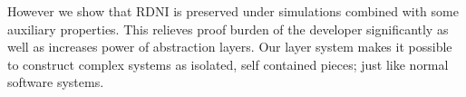 \documentclass[onecolumn]{paper}
\begin{document}
However we show that RDNI is preserved under simulations combined with some auxiliary properties. This relieves proof burden of the developer significantly as well as increases power of abstraction layers. Our layer system makes it possible to construct complex systems as isolated, self contained pieces; just like normal software systems.




\begin{comment}

\subsection*{System we consider}
We are consider a storage system with a course-grained ownership. smallest data unit will be referred as a data block, Data are accessed with "a handle", which represents a group of data blocks. Each handle has an owner that is allowed to read and write data to it as well as transfer its ownership to another user.

We are also assuming a crash-resistant transactional storage system where every API call is executed atomically. If a crash happens during an API call, then effects of the call either happens completely or doesn't happen at all.

We assume system is running on a disk with asynchronious buffered writes. Until an explicit sync operation is performeds, it is not guaranteed writes to be persisted on the disk. Ones that are persisted also could be out of order.

\subsection*{Running example}
Throughout the paper, we will follow the scenario where a user writes some data to a file and then transfers ownership of the file to another user.
\begin{lstlisting}
append_and_transfer(handle, data, new_owner)
  extend(handle, data)
  change_owner(handle, new_owner)
\end{lstlisting}
Example is simple enough to not have any distracting details but complex enough to reveal subtleties involved in a possibly malicious storage system implementation.\\


\end{comment}
\end{document}
